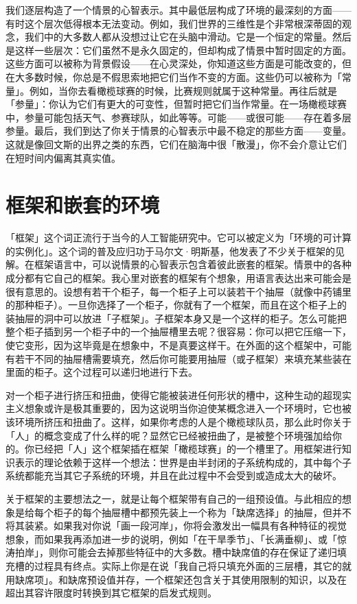 \documentclass[
  12pt,
  twoside,
  openright,
  oldfontcommands,
]{memoir}
\begin{document}
我们逐层构造了一个情景的心智表示。其中最低层构成了环境的最深刻的方面------有时这个层次低得根本无法变动。例如，我们世界的三维性是个非常根深蒂固的观念，我们中的大多数人都从没想过让它在头脑中滑动。它是一个恒定的常量。然后是这样一些层次：它们虽然不是永久固定的，但却构成了情景中暂时固定的方面。这些方面可以被称为背景假设------在心灵深处，你知道这些方面是可能改变的，但在大多数时候，你总是不假思索地把它们当作不变的方面。这些仍可以被称为「常量」。例如，当你去看橄榄球赛的时候，比赛规则就属于这种常量。再往后就是「参量」：你认为它们有更大的可变性，但暂时把它们当作常量。在一场橄榄球赛中，参量可能包括天气、参赛球队，如此等等。可能------或很可能------存在着多层参量。最后，我们到达了你关于情景的心智表示中最不稳定的那些方面------变量。这就是像回文斯的出界之类的东西，它们在脑海中很「散漫」，你不会介意让它们在短时间内偏离其真实值。

\section{框架和嵌套的环境}

「框架」这个词正流行于当今的人工智能研究中。它可以被定义为「环境的可计算的实例化」。这个词的普及应归功于马尔文·明斯基，他发表了不少关于框架的见解。在框架语言中，可以说情景的心智表示包含着彼此嵌套的框架。情景中的各种成分都有它自己的框架。我心里对嵌套的框架有个想象，用语言表达出来可能会是很有意思的。设想有若干个柜子，每一个柜子上可以装若干个抽屉（就像中药铺里的那种柜子）。一旦你选择了一个柜子，你就有了一个框架，而且在这个柜子上的装抽屉的洞中可以放进「子框架」。子框架本身又是一个这样的柜子。怎么可能把整个柜子插到另一个柜子中的一个抽屉槽里去呢？很容易：你可以把它压缩一下，使它变形，因为这毕竟是在想象中，不是真要这样干。在外面的这个框架中，可能有若干不同的抽屉槽需要填充，然后你可能要用抽屉（或子框架）来填充某些装在里面的柜子。这个过程可以递归地进行下去。

对一个柜子进行挤压和扭曲，使得它能被装进任何形状的槽中，这种生动的超现实主义想象或许是极其重要的，因为这说明当你迫使某概念进入一个环境时，它也被该环境所挤压和扭曲了。这样，如果你考虑的人是个橄榄球队员，那么此时你关于「人」的概念变成了什么样的呢？显然它已经被扭曲了，是被整个环境强加给你的。你已经把「人」这个框架插在框架「橄榄球赛」的一个槽里了。用框架进行知识表示的理论依赖于这样一个想法：世界是由半封闭的子系统构成的，其中每个子系统都能充当其它子系统的环境，并且在此过程中不会受到或造成太大的破坏。

关于框架的主要想法之一，就是让每个框架带有自己的一组预设值。与此相应的想象是给每个柜子的每个抽屉槽中都预先装上一个称为「缺席选择」的抽屉，但并不将其装紧。如果我对你说「画一段河岸」，你将会激发出一幅具有各种特征的视觉想象，而如果我再添加进一步的说明，例如「在干旱季节」、「长满垂柳」、或「惊涛拍岸」，则你可能会去掉那些特征中的大多数。槽中缺席值的存在保证了递归填充槽的过程具有终点。实际上你是在说「我自己将只填充外面的三层槽，其它的就用缺席项」。和缺席预设值并存，一个框架还包含关于其使用限制的知识，以及在超出其容许限度时转换到其它框架的启发式规则。
\end{document}

